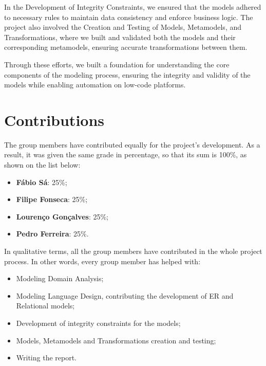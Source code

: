 \documentclass[10pt]{article}
\begin{document}
In the Development of Integrity Constraints, we ensured that the models adhered to necessary rules to maintain data consistency and enforce business logic. The project also involved the Creation and Testing of Models, Metamodels, and Transformations, where we built and validated both the models and their corresponding metamodels, ensuring accurate transformations between them.

Through these efforts, we built a foundation for understanding the core components of the modeling process, ensuring the integrity and validity of the models while enabling automation on low-code platforms.

\section{Contributions}

The group members have contributed equally for the project's development. As a result, it was given the same grade in percentage, so that its sum is 100\%, as shown on the list below:

\begin{itemize}

    \item \textbf{Fábio Sá}: 25\%;

    \item \textbf{Filipe Fonseca}: 25\%;
    
    \item \textbf{Lourenço Gonçalves}: 25\%;
    
    \item \textbf{Pedro Ferreira}: 25\%.
    
\end{itemize}

In qualitative terms, all the group members have contributed in the whole project process. In other words, every group member has helped with:

\begin{itemize}

    \item Modeling Domain Analysis;

    \item Modeling Language Design, contributing the development of ER and Relational models;

    \item Development of integrity constraints for the models;
    
    \item Models, Metamodels and Transformations creation and testing;
    
    \item Writing the report.
    
\end{itemize}
\end{document}

